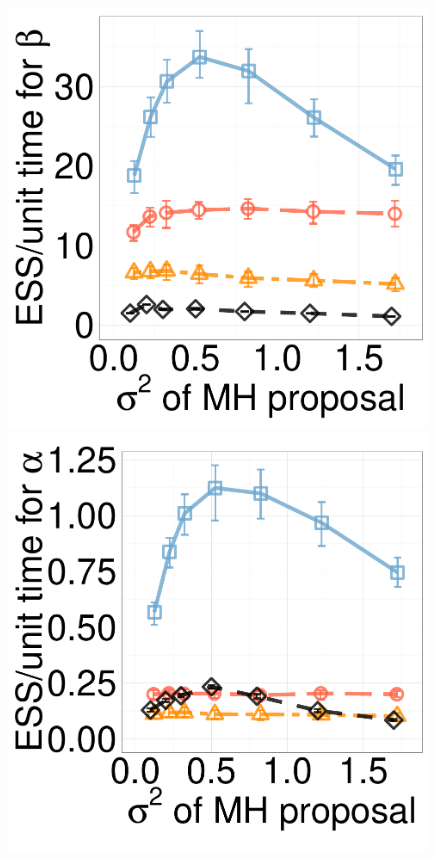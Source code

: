 \begin{figure}[H]
\begin{minipage}[hp]{0.24\linewidth}
    \includegraphics [width=0.99\textwidth, angle=0]{figs/new_experiment_figs/exp_beta_dim3_k2.pdf}
	\end{minipage}
  \begin{minipage}[hp]{0.24\linewidth}
  \centering
    \includegraphics [width=0.99\textwidth, angle=0]{figs/new_experiment_figs/exp_alpha_dim10_k2.pdf}

\end{minipage}
\end{figure}
